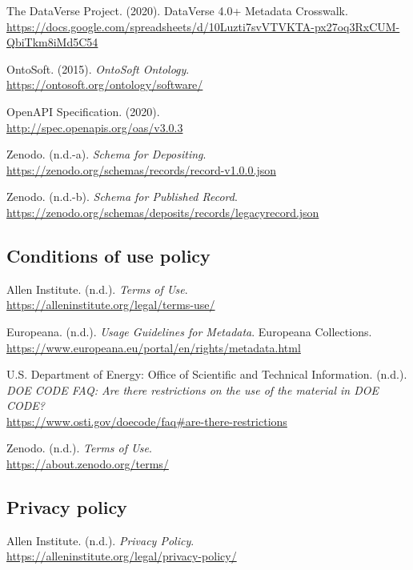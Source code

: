 \documentclass[11pt]{article}
\begin{document}
The DataVerse Project. (2020). DataVerse 4.0+ Metadata Crosswalk.\\
\url{https://docs.google.com/spreadsheets/d/10Luzti7svVTVKTA-px27oq3RxCUM-QbiTkm8iMd5C54}

OntoSoft. (2015). \emph{OntoSoft Ontology}.\\
\url{https://ontosoft.org/ontology/software/}

OpenAPI Specification. (2020).\\
\url{http://spec.openapis.org/oas/v3.0.3}

Zenodo. (n.d.-a). \emph{Schema for Depositing}.\\
\url{https://zenodo.org/schemas/records/record-v1.0.0.json}

Zenodo. (n.d.-b). \emph{Schema for Published Record}.\\
\url{https://zenodo.org/schemas/deposits/records/legacyrecord.json}


\vspace*{-2pt}
\subsection{Conditions of use policy}
\label{conditions-of-use-policy}

Allen Institute. (n.d.). \emph{Terms of Use}.\\
\url{https://alleninstitute.org/legal/terms-use/}

Europeana. (n.d.). \emph{Usage Guidelines for Metadata}. Europeana
Collections.\\
\url{https://www.europeana.eu/portal/en/rights/metadata.html}

U.S. Department of Energy: Office of Scientific and Technical
Information. (n.d.). \emph{DOE CODE FAQ: Are there restrictions on the
use of the material in DOE CODE?}\\
\url{https://www.osti.gov/doecode/faq\#are-there-restrictions}

Zenodo. (n.d.). \emph{Terms of Use}.\\
\url{https://about.zenodo.org/terms/}


\subsection{Privacy policy}
\label{privacy-policy}

Allen Institute. (n.d.). \emph{Privacy Policy}.\\
\url{https://alleninstitute.org/legal/privacy-policy/}
\end{document}
